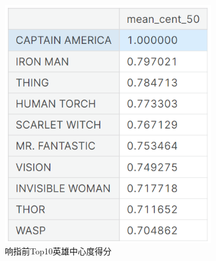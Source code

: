 \documentclass[12pt]{xjtureport}
\begin{document}
\begin{figure}[htbp]
    \centering
    \begin{subfigure}[b]{0.35\textwidth}
        \centering
        \includegraphics[width=\linewidth]{figures/响指前top10.png}
        \caption{响指前Top10英雄中心度得分}
        \label{fig:sub13}
        \end{subfigure}
    \hspace{0.1\textwidth} %
    \begin{subfigure}[b]{0.35\textwidth}
        \centering

\end{subfigure}
\end{figure}
\end{document}

